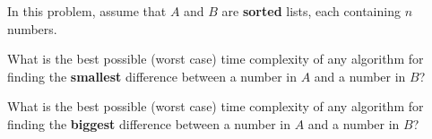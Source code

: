 \begin{prob}
    In this problem, assume that $A$ and $B$ are \textbf{sorted} lists,
    each containing $n$ numbers.

    \begin{subprobset}

        \begin{subprob}
            What is the best possible (worst case) time complexity of any
            algorithm for finding the \textbf{smallest} difference between a number in
            $A$ and a number in $B$?

        \end{subprob}

        \begin{subprob}
            What is the best possible (worst case) time complexity of any
            algorithm for finding the \textbf{biggest} difference between a number in
            $A$ and a number in $B$?
        \end{subprob}


    \end{subprobset}

\end{prob}
